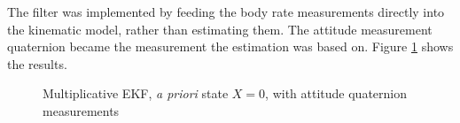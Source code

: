 \documentclass[]{aiaa-tc}%
\begin{document}
The filter was implemented by feeding the body rate measurements directly into the kinematic model, rather than estimating them. The attitude measurement quaternion became the measurement the estimation was based on. Figure \ref{fig:MEKFResults} shows the results.
	\begin{figure}[H]
		\centering
		\caption{Multiplicative EKF, \textit{a priori} state $X=0$, with attitude quaternion measurements }
		\label{fig:MEKFResults}
	\end{figure}	
\end{document}
